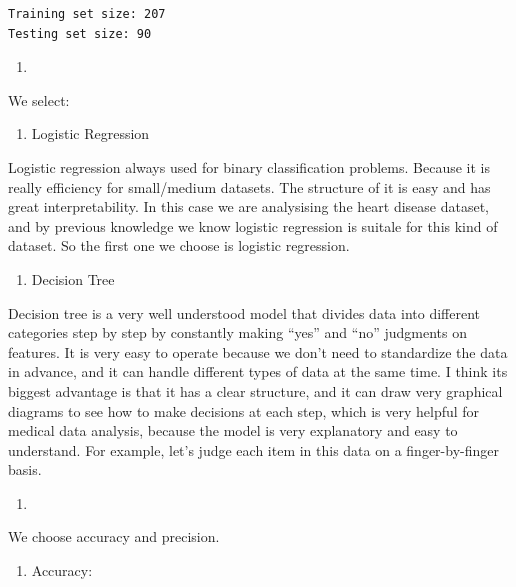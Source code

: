 \documentclass[
  11pt,
  letterpaper,
  DIV=11,
  numbers=noendperiod]{scrartcl}
\providecommand{\tightlist}{%
  \setlength{\itemsep}{0pt}\setlength{\parskip}{0pt}}\usepackage{longtable,booktabs,array}
\begin{document}
\begin{verbatim}
Training set size: 207
Testing set size: 90
\end{verbatim}

\begin{enumerate}
\def\labelenumi{(\arabic{enumi})}
\setcounter{enumi}{8}
\tightlist
\item
\end{enumerate}

We select:

\begin{enumerate}
\def\labelenumi{\arabic{enumi}.}
\tightlist
\item
  Logistic Regression
\end{enumerate}

Logistic regression always used for binary classification problems.
Because it is really efficiency for small/medium datasets. The structure
of it is easy and has great interpretability. In this case we are
analysising the heart disease dataset, and by previous knowledge we know
logistic regression is suitale for this kind of dataset. So the first
one we choose is logistic regression.

\begin{enumerate}
\def\labelenumi{\arabic{enumi}.}
\setcounter{enumi}{1}
\tightlist
\item
  Decision Tree
\end{enumerate}

Decision tree is a very well understood model that divides data into
different categories step by step by constantly making ``yes'' and
``no'' judgments on features. It is very easy to operate because we
don't need to standardize the data in advance, and it can handle
different types of data at the same time. I think its biggest advantage
is that it has a clear structure, and it can draw very graphical
diagrams to see how to make decisions at each step, which is very
helpful for medical data analysis, because the model is very explanatory
and easy to understand. For example, let's judge each item in this data
on a finger-by-finger basis.

\begin{enumerate}
\def\labelenumi{(\arabic{enumi})}
\setcounter{enumi}{9}
\tightlist
\item
\end{enumerate}

We choose accuracy and precision.

\begin{enumerate}
\def\labelenumi{\arabic{enumi}.}
\tightlist
\item
  Accuracy:
\end{enumerate}
\end{document}

